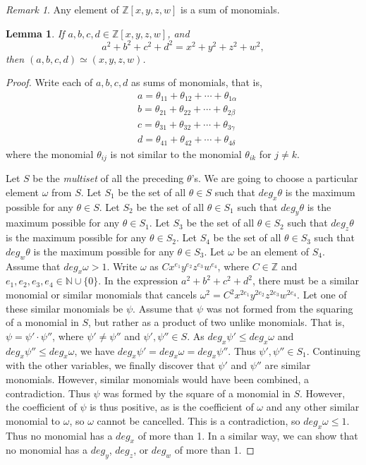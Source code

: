 \documentclass[12pt]{article}
\newtheorem{lemma}[theorem]{Lemma}
\theoremstyle{definition}
\theoremstyle{remark}
\newtheorem{remark}[theorem]{Remark}
\newcommand{\Nnn}{\mathbb N}
\newcommand{\Zzz}{\mathbb Z}
\numberwithin{equation}{section}
\begin{document}
\begin{remark}
Any element of \( \Zzz[x,y,z,w] \) is a sum of monomials.
\end{remark}
\begin{lemma}
If \(a, b, c, d \in \Zzz[x,y,z,w]\), and
\[
a^2 + b^2 + c^2 + d^2 = x^2 + y^2 + z^2 + w^2,
\]
then \( (a, b, c, d ) \simeq (x, y, z, w )\).
\end{lemma}
\begin{proof}
Write each of \( a,b,c,d \) as sums of monomials, that is, 
\begin{align*}
&a = \theta_{11} + \theta_{12} + \cdots + \theta_{1\alpha}
\\
&b = \theta_{21} + \theta_{22} + \cdots + \theta_{2\beta}
\\
&c = \theta_{31} + \theta_{32} + \cdots + \theta_{3\gamma}
\\
&d = \theta_{41} + \theta_{42} + \cdots + \theta_{4\delta}
\end{align*}
where the monomial \( \theta_{ij}\) is not similar
to the monomial \(\theta_{ik}\) for \( j \neq k\).

Let \(S\) be the \emph{multiset} of all the preceding \( \theta \)'s.
We are going to choose a particular element \( \omega \)
from \( S \).
Let \( S_1 \) be the set of all \( \theta \in S  \) such that
\( deg_x \theta \) is the maximum possible for any \( \theta \in S \).
Let \( S_2 \) be the set of all \( \theta \in S_1  \) such that
\( deg_y \theta \) is the maximum possible for any \( \theta \in S_1 \).
Let \( S_3 \) be the set of all \( \theta \in S_2  \) such that
\( deg_z \theta \) is the maximum possible for any \( \theta \in S_2 \).
Let \( S_4 \) be the set of all \( \theta \in S_3  \) such that
\( deg_w \theta \) is the maximum possible for any \( \theta \in S_3 \).
Let \( \omega \) be an element of \( S_4 \). Assume that \(deg_x \omega > 1 \).
Write \( \omega \) as \(Cx^{e_1}y^{e_2}z^{e_3}w^{e_4}\), where \( C \in \Zzz \)
and \( e_1,e_2,e_3,e_4 \in \Nnn \cup \{0\} \). In the expression  
\(a^2 + b^2 + c^2 + d^2\), there must be a similar monomial or similar monomials
that cancels \( \omega^2 = C^2x^{2e_1}y^{2e_2}z^{2e_3}w^{2e_4}\).
Let one of these similar monomials be \( \psi \). Assume that \( \psi \)
was not formed from the squaring of a monomial in \(S\), but rather
as a product of two unlike monomials.
That is, \( \psi = \psi' \cdot \psi''\), where \( \psi' \neq \psi'' \)
and \( \psi' , \psi'' \in S \). As \( deg_x \psi' \leq deg_x \omega \)
and \( deg_x \psi'' \leq deg_x \omega \),
we have \( deg_x \psi' = deg_x \omega = deg_x \psi'' \).
Thus \( \psi' , \psi'' \in S_1 \). Continuing with the other variables, we
finally discover that \( \psi' \) and \( \psi'' \) are similar monomials. However,
similar monomials would have been combined, a contradiction. Thus \( \psi \) was
formed by the square of a monomial in \( S \). However, the coefficient
of \( \psi \) is thus positive, as is the coefficient of \( \omega \) and
any other similar monomial to \( \omega \), so \( \omega \) cannot be cancelled. This is
a contradiction, so \( deg_x \omega \leq 1 \). Thus no monomial has a \( deg_x \) of more
than 1. In a similar way, we can show that no monomial has a \( deg_y \), \( deg_z \),
or \( deg_w \) of more than 1.


\end{proof}
\end{document}
